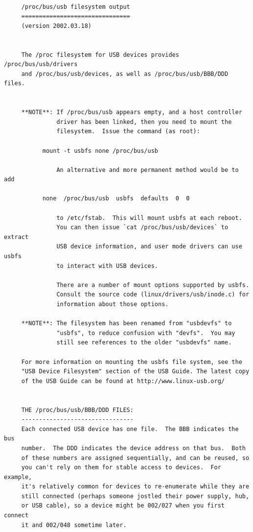 \footnotesize
\begin{verbatim}
     
     /proc/bus/usb filesystem output
     ===============================
     (version 2002.03.18)
     
     
     The /proc filesystem for USB devices provides /proc/bus/usb/drivers
     and /proc/bus/usb/devices, as well as /proc/bus/usb/BBB/DDD files.
     
     
     **NOTE**: If /proc/bus/usb appears empty, and a host controller
               driver has been linked, then you need to mount the
               filesystem.  Issue the command (as root):
     
           mount -t usbfs none /proc/bus/usb
     
               An alternative and more permanent method would be to add
     
           none  /proc/bus/usb  usbfs  defaults  0  0
     
               to /etc/fstab.  This will mount usbfs at each reboot.
               You can then issue `cat /proc/bus/usb/devices` to extract
               USB device information, and user mode drivers can use usbfs
               to interact with USB devices.
     
               There are a number of mount options supported by usbfs.
               Consult the source code (linux/drivers/usb/inode.c) for
               information about those options.
     
     **NOTE**: The filesystem has been renamed from "usbdevfs" to
               "usbfs", to reduce confusion with "devfs".  You may
               still see references to the older "usbdevfs" name.
     
     For more information on mounting the usbfs file system, see the
     "USB Device Filesystem" section of the USB Guide. The latest copy
     of the USB Guide can be found at http://www.linux-usb.org/
     
     
     THE /proc/bus/usb/BBB/DDD FILES:
     --------------------------------
     Each connected USB device has one file.  The BBB indicates the bus
     number.  The DDD indicates the device address on that bus.  Both
     of these numbers are assigned sequentially, and can be reused, so
     you can't rely on them for stable access to devices.  For example,
     it's relatively common for devices to re-enumerate while they are
     still connected (perhaps someone jostled their power supply, hub,
     or USB cable), so a device might be 002/027 when you first connect
     it and 002/048 sometime later.
     

\end{verbatim}
